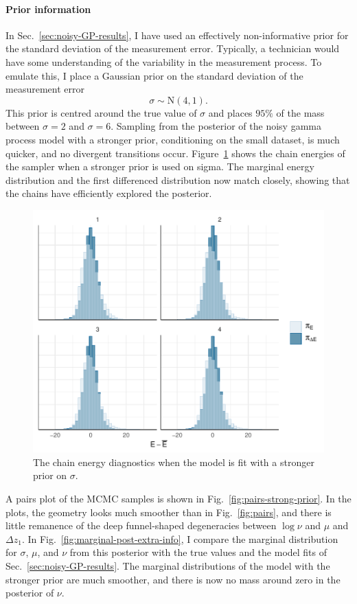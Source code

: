 \paragraph*{Prior information}

In Sec.~\ref{sec:noisy-GP-results}, I have used an effectively non-informative prior for the standard deviation of the measurement error. Typically, a technician would have some understanding of the variability in the measurement process. To emulate this, I place a Gaussian prior on the standard deviation of the measurement error
\begin{equation*}
  \sigma \sim \mbox{N}(4, 1).
\end{equation*}
This prior is centred around the true value of $\sigma$ and places $95\%$ of the mass between $\sigma = 2$ and $\sigma = 6$. Sampling from the posterior of the noisy gamma process model with a stronger prior, conditioning on the small dataset, is much quicker, and no divergent transitions occur. Figure~\ref{fig:energies-strong-prior} shows the chain energies of the sampler when a stronger prior is used on sigma. The marginal energy distribution and the first differenced distribution now match closely, showing that the chains have efficiently explored the posterior.

\begin{figure}
  \centering
  \includegraphics[width=0.8\columnwidth]{./figures/ch-4/strong-prior-nuts-energy.pdf}
  \caption{The chain energy diagnostics when the model is fit with a stronger prior on $\sigma$.}
  \label{fig:energies-strong-prior}
\end{figure}

A pairs plot of the MCMC samples is shown in Fig.~\ref{fig:pairs-strong-prior}. In the plots, the geometry looks much smoother than in Fig.~\ref{fig:pairs}, and there is little remanence of the deep funnel-shaped degeneracies between $\log{\nu}$ and $\mu$ and $\Delta z_1$. In Fig.~\ref{fig:marginal-post-extra-info}, I compare the marginal distribution for $\sigma$, $\mu$, and $\nu$ from this posterior with the true values and the model fits of Sec.~\ref{sec:noisy-GP-results}. The marginal distributions of the model with the stronger prior are much smoother, and there is now no mass around zero in the posterior of $\nu$.


